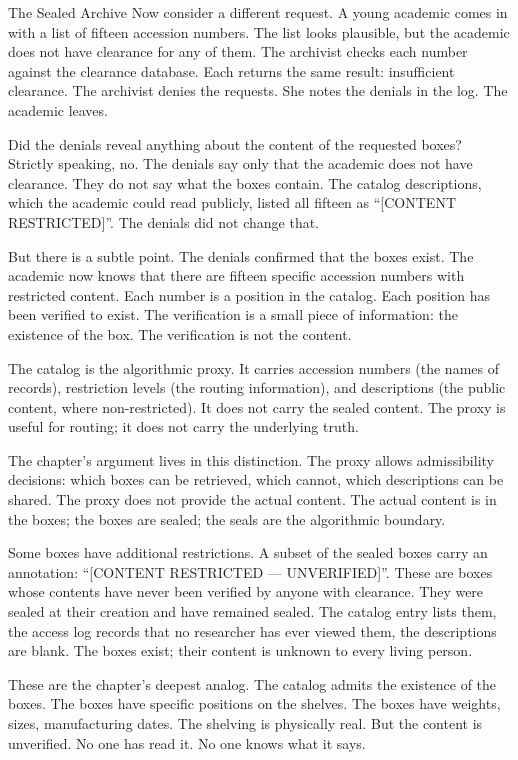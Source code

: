 \begin{coda}{The Sealed Archive}
Now consider a different request. A young academic comes in with a
list of fifteen accession numbers. The list looks plausible, but
the academic does not have clearance for any of them. The
archivist checks each number against the clearance database. Each
returns the same result: insufficient clearance. The archivist
denies the requests. She notes the denials in the log. The
academic leaves.

Did the denials reveal anything about the content of the requested
boxes? Strictly speaking, no. The denials say only that the
academic does not have clearance. They do not say what the boxes
contain. The catalog descriptions, which the academic could read
publicly, listed all fifteen as ``[CONTENT RESTRICTED]''. The
denials did not change that.

But there is a subtle point. The denials confirmed that the
boxes exist. The academic now knows that there are fifteen
specific accession numbers with restricted content. Each number
is a position in the catalog. Each position has been verified to
exist. The verification is a small piece of information: the
existence of the box. The verification is not the content.

The catalog is the algorithmic proxy. It carries accession
numbers (the names of records), restriction levels (the routing
information), and descriptions (the public content, where
non-restricted). It does not carry the sealed content. The proxy
is useful for routing; it does not carry the underlying truth.

The chapter's argument lives in this distinction. The proxy
allows admissibility decisions: which boxes can be retrieved,
which cannot, which descriptions can be shared. The proxy does
not provide the actual content. The actual content is in the
boxes; the boxes are sealed; the seals are the algorithmic
boundary.

Some boxes have additional restrictions. A subset of the
sealed boxes carry an annotation: ``[CONTENT
RESTRICTED --- UNVERIFIED]''. These are boxes whose contents
have never been verified by anyone with clearance. They were
sealed at their creation and have remained sealed. The catalog
entry lists them, the access log records that no researcher
has ever viewed them, the descriptions are blank. The boxes
exist; their content is unknown to every living person.

These are the chapter's deepest analog. The catalog admits the
existence of the boxes. The boxes have specific positions on
the shelves. The boxes have weights, sizes, manufacturing
dates. The shelving is physically real. But the content is
unverified. No one has read it. No one knows what it says.


\end{coda}

